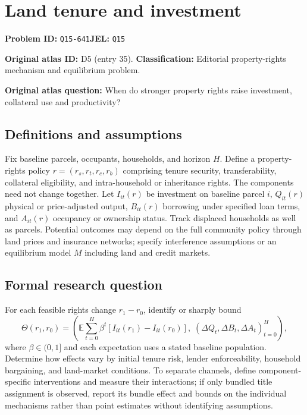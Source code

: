 \documentclass[11pt,a4paper]{article}
\begin{document}
\section*{Land tenure and investment}
\textbf{Problem ID:} \texttt{Q15-641}\quad \textbf{JEL:} \texttt{Q15}\par
\label{problem:OP-0035}
\label{atlas:prob:D5}
\noindent\textbf{Original atlas ID:} D5 (entry 35). \textbf{Classification:} Editorial property-rights mechanism and equilibrium problem.

\noindent\textbf{Original atlas question:} When do stronger property rights raise investment, collateral use and productivity?

\subsection*{Definitions and assumptions}
Fix baseline parcels, occupants, households, and horizon $H$. Define a property-rights policy $r=(r_s,r_t,r_c,r_b)$ comprising tenure security, transferability, collateral eligibility, and intra-household or inheritance rights. The components need not change together. Let $I_{it}(r)$ be investment on baseline parcel $i$, $Q_{it}(r)$ physical or price-adjusted output, $B_{it}(r)$ borrowing under specified loan terms, and $A_{it}(r)$ occupancy or ownership status. Track displaced households as well as parcels. Potential outcomes may depend on the full community policy through land prices and insurance networks; specify interference assumptions or an equilibrium model $M$ including land and credit markets.
\subsection*{Formal research question}
For each feasible rights change $r_1-r_0$, identify or sharply bound
\[
 \Theta(r_1,r_0)=\left(
 \mathbb E\sum_{t=0}^H\beta^t[I_{it}(r_1)-I_{it}(r_0)],\;
 (\Delta Q_t,\Delta B_t,\Delta A_t)_{t=0}^H\right),
\]
where $\beta\in(0,1]$ and each expectation uses a stated baseline population. Determine how effects vary by initial tenure risk, lender enforceability, household bargaining, and land-market conditions. To separate channels, define component-specific interventions and measure their interactions; if only bundled title assignment is observed, report its bundle effect and bounds on the individual mechanisms rather than point estimates without identifying assumptions.
\end{document}
